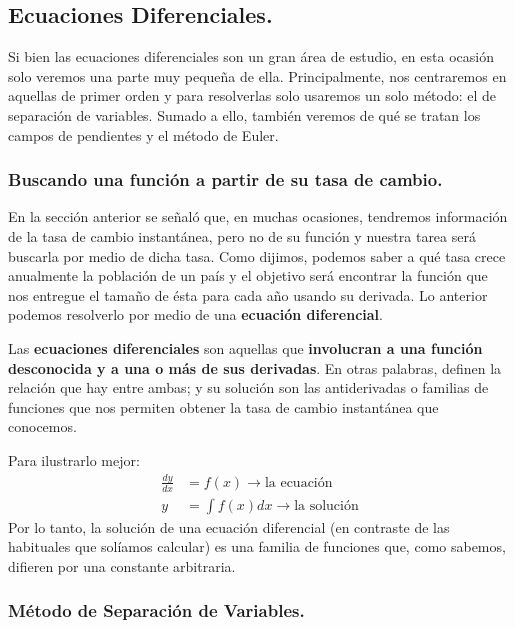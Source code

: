\documentclass[12pt]{article}
\begin{document}
\subsection{Ecuaciones Diferenciales.}

Si bien las ecuaciones diferenciales son un gran área de estudio, en esta ocasión solo veremos una parte muy pequeña de ella. Principalmente, nos centraremos en aquellas de primer orden y para resolverlas solo usaremos un solo método: el de separación de variables. Sumado a ello, también veremos de qué se tratan los campos de pendientes y el método de Euler.

\subsubsection{Buscando una función a partir de su tasa de cambio.}

En la sección anterior se señaló que, en muchas ocasiones, tendremos información de la tasa de cambio instantánea, pero no de su función y nuestra tarea será buscarla por medio de dicha tasa. Como dijimos, podemos saber a qué tasa crece anualmente la población de un país y el objetivo será encontrar la función que nos entregue el tamaño de ésta para cada año usando su derivada. Lo anterior podemos resolverlo por medio de una \textbf{ecuación diferencial}.

Las \textbf{ecuaciones diferenciales} son aquellas que \textbf{involucran a una función desconocida y a una o más de sus derivadas}. En otras palabras, definen la relación que hay entre ambas; y su solución son las antiderivadas o familias de funciones que nos permiten obtener la tasa de cambio instantánea que conocemos.

Para ilustrarlo mejor:
\begin{align*}
  \frac{dy}{dx} &= f(x) \rightarrow \text{la ecuación} \\
  y &= \int f(x) dx \rightarrow \text{la solución}
\end{align*}
Por lo tanto, la solución de una ecuación diferencial (en contraste de las habituales que solíamos calcular) es una familia de funciones que, como sabemos, difieren por una constante arbitraria.

\subsubsection{Método de Separación de Variables.}
\end{document}
